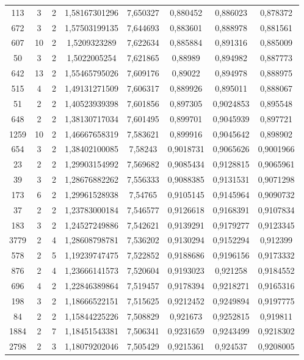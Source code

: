 \begin{longtable}{|c|c|c|c|c|c|c|c|}
113 & 3 & 2 & 1,58167301296 & 7,650327 & 0,880452 & 0,886023 & 0,878372 \\
672 & 3 & 2 & 1,57503199135 & 7,644693 & 0,883601 & 0,888978 & 0,881561 \\
607 & 10 & 2 & 1,5209323289 & 7,622634 & 0,885884 & 0,891316 & 0,885009 \\
50 & 3 & 2 & 1,5022005254 & 7,621865 & 0,88989 & 0,894982 & 0,887773 \\
642 & 13 & 2 & 1,55465795026 & 7,609176 & 0,89022 & 0,894978 & 0,888975 \\
515 & 4 & 2 & 1,49131271509 & 7,606317 & 0,889926 & 0,895011 & 0,888067 \\
51 & 2 & 2 & 1,40523939398 & 7,601856 & 0,897305 & 0,9024853 & 0,895548 \\
648 & 2 & 2 & 1,38130717034 & 7,601495 & 0,899701 & 0,9045939 & 0,897721 \\
1259 & 10 & 2 & 1,46667658319 & 7,583621 & 0,899916 & 0,9045642 & 0,898902 \\
654 & 3 & 2 & 1,38402100085 & 7,58243 & 0,9018731 & 0,9065626 & 0,9001966 \\
23 & 2 & 2 & 1,29903154992 & 7,569682 & 0,9085434 & 0,9128815 & 0,9065961 \\
39 & 3 & 2 & 1,28676882262 & 7,556333 & 0,9088385 & 0,9131531 & 0,9071298 \\
173 & 6 & 2 & 1,29961528938 & 7,54765 & 0,9105145 & 0,9145964 & 0,9090732 \\
37 & 2 & 2 & 1,23783000184 & 7,546577 & 0,9126618 & 0,9168391 & 0,9107834 \\
183 & 3 & 2 & 1,24527249886 & 7,542621 & 0,9139291 & 0,9179277 & 0,9123345 \\
3779 & 2 & 4 & 1,28608798781 & 7,536202 & 0,9130294 & 0,9152294 & 0,912399 \\
578 & 2 & 5 & 1,19239747475 & 7,522852 & 0,9188686 & 0,9196156 & 0,9173332 \\
876 & 2 & 4 & 1,23666141573 & 7,520604 & 0,9193023 & 0,921258 & 0,9184552 \\
696 & 4 & 2 & 1,22846389864 & 7,519457 & 0,9178394 & 0,9218271 & 0,9165316 \\
198 & 3 & 2 & 1,18666522151 & 7,515625 & 0,9212452 & 0,9249894 & 0,9197775 \\
84 & 2 & 2 & 1,15844225226 & 7,508829 & 0,921673 & 0,9252815 & 0,919811 \\
1884 & 2 & 7 & 1,18451543381 & 7,506341 & 0,9231659 & 0,9243499 & 0,9218302 \\
2798 & 2 & 3 & 1,18079202046 & 7,505429 & 0,9215361 & 0,924537 & 0,9208005 \\

\end{longtable}
